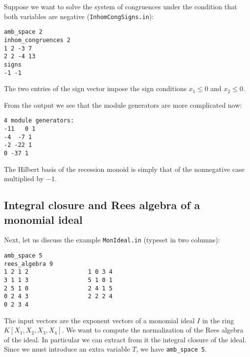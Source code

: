 \documentclass[12pt,a4paper]{scrartcl}
\theoremstyle{definition}
\def\ttt{\texttt}
\begin{document}
Suppose we want to solve the system of congruences under the condition that both variables are negative (\verb|InhomCongSigns.in|):

\begin{Verbatim}
amb_space 2
inhom_congruences 2
1 2 -3 7
2 2 -4 13
signs
-1 -1
\end{Verbatim}
The two entries of the sign vector impose the sign conditions $x_1\le 0$ and $x_2\le 0$.

From the output we see that the module generators are more complicated now:
\begin{Verbatim}
4 module generators:
-11   0 1
-4  -7 1
-2 -22 1
0 -37 1
\end{Verbatim}
The Hilbert basis of the recession monoid is simply that of the nonnegative case multiplied by $-1$.

\subsection{Integral closure and Rees algebra of a monomial ideal}\label{Rees}

Next, let us discuss the example \ttt{MonIdeal.in} (typeset in two columns):

\begin{Verbatim}
amb_space 5
rees_algebra 9
1 2 1 2                 1 0 3 4
3 1 1 3                 5 1 0 1
2 5 1 0                 2 4 1 5
0 2 4 3                 2 2 2 4
0 2 3 4
\end{Verbatim}
The input vectors are the exponent vectors of a monomial ideal $I$ in the ring $K[X_1,X_2,X_3,X_4]$. We want to compute the normalization of the Rees algebra of the ideal. In particular we can extract from it the integral closure of the ideal. Since we must introduce an extra variable $T$, we have \verb|amb_space 5|.
\end{document}
